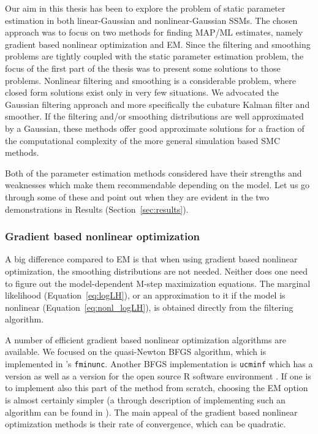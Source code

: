 Our aim in this thesis has been to explore the problem of static parameter estimation
in both linear-Gaussian and nonlinear-Gaussian SSMs. The chosen approach was to focus
on two methods for finding MAP/ML estimates, namely gradient based nonlinear optimization
and EM. Since the filtering and smoothing problems are tightly coupled with the static
parameter estimation problem, the focus of the first part of the thesis was to
present some solutions to those problems. Nonlinear filtering and smoothing is
a considerable problem, where closed form solutions exist only in very few situations.
We advocated the Gaussian filtering approach and more specifically the cubature Kalman
filter and smoother. If the filtering and/or smoothing distributions are well approximated
by a Gaussian, these methods offer good approximate solutions for a fraction of
the computational complexity of the more general simulation based SMC methods.
 
Both of the parameter estimation methods considered have their strengths and weaknesses
which make them recommendable depending on the model. Let us go through
some of these and point out when they are evident in the two demonstrations in
Results (Section~\ref{sec:results}).

\subsubsection*{Gradient based nonlinear optimization}

A big difference compared to EM is that when using
gradient based nonlinear optimization, the smoothing distributions
are not needed. Neither does one need to figure out the model-dependent
M-step maximization equations. The marginal likelihood (Equation~\eqref{eq:logLH}), 
or an approximation to it if the model is nonlinear (Equation~\eqref{eq:nonl_logLH}), 
is obtained directly from the filtering algorithm.

A number of efficient gradient based nonlinear optimization
algorithms are available. We focused on the quasi-Newton BFGS algorithm,
which is implemented in \matlab's \texttt{fminunc}. Another BFGS implementation
is \texttt{ucminf} which has a \matlab{} version as well as a version for the open source
R software environment \parencite{Nielsen2000,rucminf2012,r2012}. If one is to
implement also this part of the method from scratch, choosing the EM option is
almost certainly simpler (a through description of implementing such an algorithm
can be found in \textcite{Nielsen2000}). The main appeal of the gradient based
nonlinear optimization methods is their rate of convergence, which can
be quadratic.  

